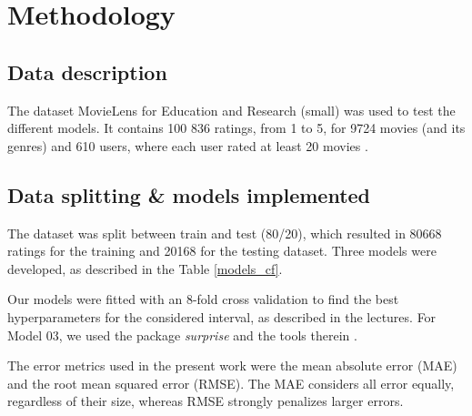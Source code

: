 \documentclass[conference]{IEEEtran}
\begin{document}
\section{Methodology}


\subsection{Data description}

The dataset MovieLens for Education and Research (small) was used to test the different models. It contains 100 836 ratings, from 1 to 5, for 9724 movies (and its genres) and 610 users, where each user rated at least 20 movies \cite{MovieLens}. 

\subsection{Data splitting \& models implemented}

The dataset was split between train and test (80/20), which resulted in 80668 ratings for the training and 20168 for the testing dataset. Three models were developed, as described in the Table \ref{models_cf}.

\begin{table}[H]
\centering
\caption{Models implemented to the MovieLens dataset.}
\label{models_cf}
\end{table}

Our models were fitted with an 8-fold cross validation to find the best hyperparameters for the considered interval, as described in the lectures. For Model 03, we used the package \textit{surprise} and the tools therein \cite{surprise}. 

The error metrics used in the present work were the mean absolute error (MAE) and the root mean squared error (RMSE). The MAE considers all error equally, regardless of their size, whereas RMSE strongly penalizes larger errors.
\end{document}
